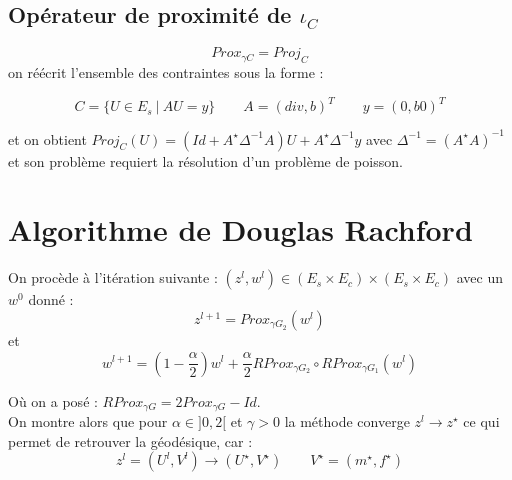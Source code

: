 \documentclass[a4paper,12pt]{article}
\begin{document}
\subsection{Opérateur de proximité de $\iota_C$}

$$
Prox_{\gamma C} = Proj_C
$$
on réécrit l'ensemble des contraintes sous la forme : 

$$
C=\{U\in E_s\ | \ AU=y\} \qquad A=(div,b)^T \qquad y = (0,b0)^T
$$

et on obtient $Proj_C(U)=(Id +A^{\star}\Delta^{-1}A)U + A^{\star} \Delta^{-1}y$ avec $\Delta^{-1}=(A^{\star}A)^{-1}$ et son problème requiert la résolution d'un problème de poisson. 

\section{Algorithme de Douglas Rachford}
On procède à l'itération suivante : $(z^l,w^l)\in (E_s\times E_c)\times (E_s\times E_c)$ avec un $w^0$ donné : 
$$
z^{l+1}=Prox_{\gamma G_2} (w^l)
$$
et 
$$
w^{l+1}=(1-\frac{\alpha}{2})w^l + \frac{\alpha}{2}RProx_{\gamma G_2}\circ RProx_{\gamma G_1} (w^l)
$$

Où on a posé : $RProx_{\gamma G} = 2Prox_{\gamma G}-Id$.\\
On montre alors que pour $\alpha\in ]0,2[$ et $\gamma>0$ la méthode converge $z^l\rightarrow z^{\star}$ ce qui permet de retrouver la géodésique, car : 
$$
z^l=(U^l,V^l)\rightarrow (U^{\star},V^{\star}) \qquad V^{\star}=(m^{\star},f^{\star})
$$





\newpage


\newpage
\end{document}
